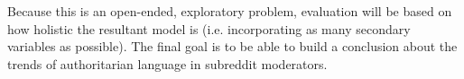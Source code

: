 \documentclass[letterpaper,twocolumn,10pt]{article}
\begin{document}
Because this is an open-ended, exploratory problem, evaluation will be based on how holistic the resultant model is (i.e. incorporating as many secondary variables as possible). The final goal is to be able to build a conclusion about the trends of authoritarian language in subreddit moderators.




\end{document}
